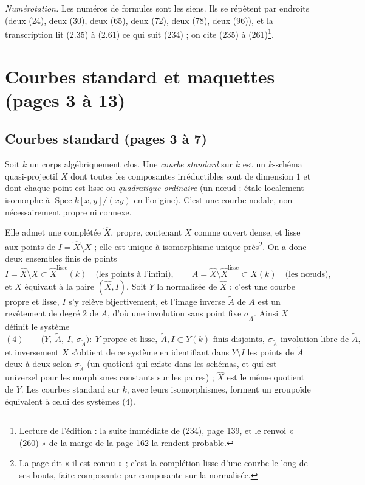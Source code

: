 \documentclass[11pt,a4paper]{article}
\begin{document}
\emph{Numérotation.} Les numéros de formules sont les siens. Ils se répètent par
endroits (deux (24), deux (30), deux (65), deux (72), deux (78), deux (96)), et
la transcription lit (2.35) à (2.61) ce qui suit (234) ; on cite (235) à
(261)\footnote{Lecture de l'édition : la suite immédiate de (234), page 139, et
le renvoi « (260) » de la marge de la page 162 la rendent probable.}.

\section*{Courbes standard et maquettes (pages 3 à 13)}

\subsection*{Courbes standard (pages 3 à 7)}

Soit $k$ un corps algébriquement clos. Une \emph{courbe standard} sur $k$ est un
$k$-schéma quasi-projectif $X$ dont toutes les composantes irréductibles sont de
dimension $1$ et dont chaque point est lisse ou \emph{quadratique ordinaire}
(un nœud : étale-localement isomorphe à $\operatorname{Spec} k[x,y]/(xy)$ en
l'origine). C'est une courbe nodale, non nécessairement propre ni connexe.

Elle admet une complétée $\widehat{X}$, propre, contenant $X$ comme ouvert dense,
et lisse aux points de $I = \widehat{X} \setminus X$ ; elle est unique à
isomorphisme unique près\footnote{La page dit « il est connu » ; c'est la
complétion lisse d'une courbe le long de ses bouts, faite composante par
composante sur la normalisée.}. On a donc deux ensembles finis de points
\[
I = \widehat{X} \setminus X \subset \widehat{X}^{\mathrm{lisse}}(k)
\quad \text{(les points à l'infini)}, \qquad
A = \widehat{X} \setminus \widehat{X}^{\mathrm{lisse}} \subset X(k)
\quad \text{(les nœuds)},
\]
et $X$ équivaut à la paire $(\widehat{X}, I)$. Soit $Y$ la normalisée de
$\widehat{X}$ ; c'est une courbe propre et lisse, $I$ s'y relève bijectivement,
et l'image inverse $\widetilde{A}$ de $A$ est un revêtement de degré $2$ de $A$,
d'où une involution sans point fixe $\sigma_{\widetilde{A}}$. Ainsi $X$ définit
le système
\[
(4) \qquad \bigl(Y,\ \widetilde{A},\ I,\ \sigma_{\widetilde{A}}\bigr) :
\ Y \text{ propre et lisse},\ \widetilde{A}, I \subset Y(k) \text{ finis
disjoints},\ \sigma_{\widetilde{A}} \text{ involution libre de } \widetilde{A},
\]
et inversement $X$ s'obtient de ce système en identifiant dans $Y \setminus I$
les points de $\widetilde{A}$ deux à deux selon $\sigma_{\widetilde{A}}$ (un
quotient qui existe dans les schémas, et qui est universel pour les morphismes
constants sur les paires) ; $\widehat{X}$ est le même quotient de $Y$. Les
courbes standard sur $k$, avec leurs isomorphismes, forment un groupoïde
équivalent à celui des systèmes (4).
\end{document}

